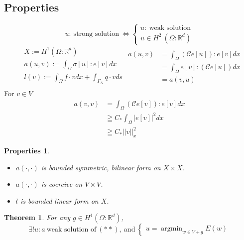 \documentclass[a4paper,12pt]{article}
\newtheorem{prop}{Properties}
\newtheorem{theorem}{Theorem}
\newcommand{\R}{\mathbb{R}}
\newcommand{\Cmod}{\mathcal{C}}
\DeclareMathOperator*{\argmin}{argmin}
\begin{document}
\subsection{Properties}
\begin{equation*}
u:\ \text{strong solution}\ \Leftrightarrow \begin{cases}
u:\ \text{weak solution}\\
u\in H^2\ (\Omega : \R^d)
\end{cases}
\end{equation*}
\begin{equation*}
\begin{aligned}
&X:= H^1(\Omega : \R^d)\\
&a(u,v) := \int_\Omega \sigma[u] : e[v] dx\\
&l(v) := \int_\Omega f\cdot v dx + \int_{\Gamma_N} q \cdot v ds\\
\end{aligned}
\begin{aligned}
a(u,v) &= \int_\Omega (\Cmod e[u]) : e[v] dx\\
&= \int_\Omega e[v] : (\Cmod e[u]) dx\\
&= a(v,u)
\end{aligned}
\end{equation*}
For $v \in V$
\begin{equation*}
\begin{aligned}
a(v,v) &= \int_\Omega (\Cmod e[v]) : e[v] dx\\
&\geqq C_* \int_\Omega |e[v]|^2 dx\\
&\geqq C_* ||v||^2_x
\end{aligned}
\end{equation*}
\begin{prop}
	\begin{itemize}
		\item $a(\cdot,\cdot)$ is bounded symmetric, bilinear form on $X \times X$.
		\item $a(\cdot,\cdot)$ is coercive on $V \times V$.
		\item $l$ is bounded linear form on $X$.
	\end{itemize}
\end{prop}
\begin{theorem}
	For any $g\in H^1(\Omega : \R^d)$,
	\begin{equation*}
	\exists! u:a\ \text{weak solution of}\ (**),\ \text{and}\ \begin{cases}
	u=\argmin_{w\in V+g}E(w)
	\end{cases}
	\end{equation*}
\end{theorem}
\end{document}
